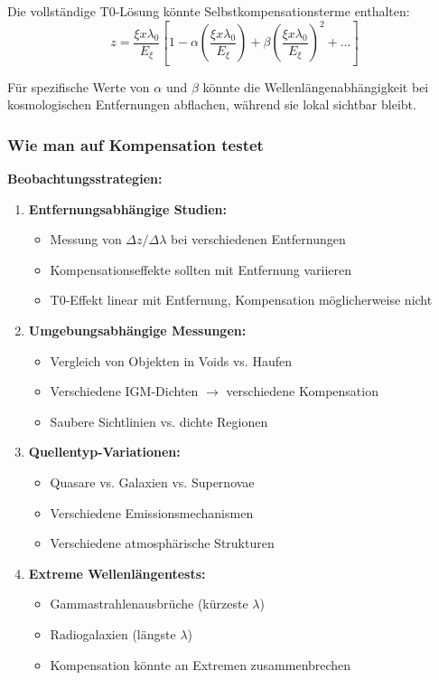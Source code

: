 \documentclass[12pt,a4paper]{article}
\theoremstyle{definition}
\begin{document}
	Die vollst\"andige T0-L\"osung k\"onnte Selbstkompensationsterme enthalten:
	\begin{equation}
		z = \frac{\xi x \lambda_0}{E_\xi}\left[1 - \alpha\left(\frac{\xi x \lambda_0}{E_\xi}\right) + \beta\left(\frac{\xi x \lambda_0}{E_\xi}\right)^2 + ...\right]
	\end{equation}
	
	F\"ur spezifische Werte von $\alpha$ und $\beta$ k\"onnte die Wellenl\"angenabh\"angigkeit bei kosmologischen Entfernungen abflachen, w\"ahrend sie lokal sichtbar bleibt.
	
	\subsubsection{Wie man auf Kompensation testet}
	
	\textbf{Beobachtungsstrategien:}
	\begin{enumerate}
		\item \textbf{Entfernungsabh\"angige Studien:}
		\begin{itemize}
			\item Messung von $\Delta z/\Delta\lambda$ bei verschiedenen Entfernungen
			\item Kompensationseffekte sollten mit Entfernung variieren
			\item T0-Effekt linear mit Entfernung, Kompensation m\"oglicherweise nicht
		\end{itemize}
		
		\item \textbf{Umgebungsabh\"angige Messungen:}
		\begin{itemize}
			\item Vergleich von Objekten in Voids vs. Haufen
			\item Verschiedene IGM-Dichten $\rightarrow$ verschiedene Kompensation
			\item Saubere Sichtlinien vs. dichte Regionen
		\end{itemize}
		
		\item \textbf{Quellentyp-Variationen:}
		\begin{itemize}
			\item Quasare vs. Galaxien vs. Supernovae
			\item Verschiedene Emissionsmechanismen
			\item Verschiedene atmosph\"arische Strukturen
		\end{itemize}
		
		\item \textbf{Extreme Wellenl\"angentests:}
		\begin{itemize}
			\item Gammastrahlenausbr\"uche (k\"urzeste $\lambda$)
			\item Radiogalaxien (l\"angste $\lambda$)
			\item Kompensation k\"onnte an Extremen zusammenbrechen
		\end{itemize}
	\end{enumerate}
	
\end{document}
